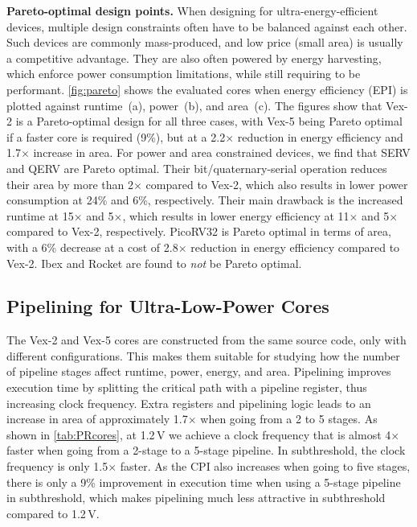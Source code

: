 \noindent
\textbf{Pareto-optimal design points.}
When designing for ultra-energy-efficient devices, multiple design constraints often have to be balanced against each other.
Such devices are commonly mass-produced, and low price (small area) is usually a competitive advantage.  They are also often powered by energy harvesting, which enforce power consumption limitations, while still requiring to be performant.
\autoref{fig:pareto} shows the evaluated cores when energy efficiency (EPI) is plotted against runtime~(a), power~(b), and area~(c).
The figures show that Vex-2 is a Pareto-optimal design for all three cases, with Vex-5 being Pareto optimal if a faster core is required (9\%), but at a 2.2$\times$ reduction in energy efficiency and 1.7$\times$ increase in area.
For power and area constrained devices, we find that SERV and QERV are Pareto optimal.
Their bit/quaternary-serial operation reduces their area by more than 2$\times$ compared to Vex-2, which also results in lower power consumption at 24\% and 6\%, respectively.
Their main drawback is the increased runtime at 15$\times$ and 5$\times$, which results in lower energy efficiency at 11$\times$ and 5$\times$ compared to Vex-2, respectively.
PicoRV32 is Pareto optimal in terms of area, with a 6\% decrease at a cost of 2.8$\times$ reduction in energy efficiency compared to Vex-2.
Ibex and Rocket are found to \emph{not} be Pareto optimal.


\subsection{Pipelining for Ultra-Low-Power Cores}

The Vex-2 and Vex-5 cores are constructed from the same source code, only with different configurations.
This makes them suitable for studying how the number of pipeline stages affect runtime, power, energy, and area.
Pipelining improves execution time by splitting the critical path with a pipeline register, thus increasing clock frequency. 
Extra registers and pipelining logic leads to an increase in area of approximately 1.7$\times$ when going from a 2 to 5 stages. 
As shown in \autoref{tab:PRcores}, at 1.2\,V we achieve a clock frequency that is almost 4$\times$ faster when going from a 2-stage to a 5-stage pipeline.
In subthreshold, the clock frequency is only 1.5$\times$ faster.
As the CPI also increases when going to five stages, there is only a 9\% improvement in execution time when using a 5-stage pipeline in subthreshold, which makes pipelining much less attractive in subthreshold compared to 1.2\,V. 

